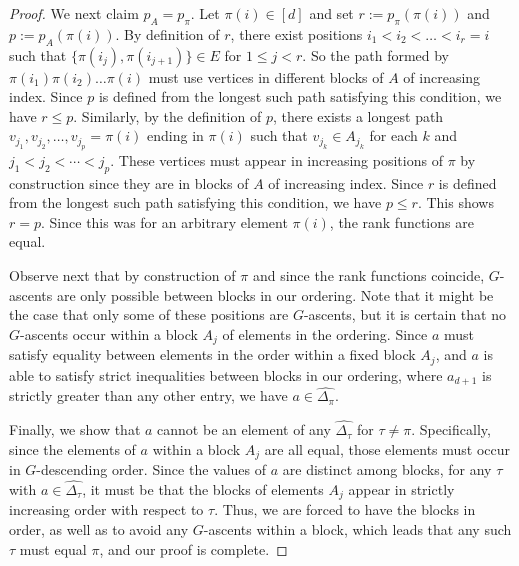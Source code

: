\documentclass[11pt]{amsart}
\newcommand{\rk}[1][\pi]{p_{#1}}
\begin{document}
\begin{proof}
We next claim $\rk[A] = \rk[\pi]$. 
Let $\pi(i) \in [d]$ and set $r := \rk(\pi(i))$ and $p :=\rk[A](\pi(i))$. 
By definition of $r$, there exist positions $i_1 < i_2 < \dots < i_r = i$ such that $\{\pi(i_j), \pi(i_{j+1}) \} \in E$ for $1 \le j < r$.
So the path formed by $\pi(i_1) \pi(i_2) \dots \pi(i)$ must use vertices in different blocks of $A$ of increasing index.
Since $p$ is defined from the longest such path satisfying this condition, we have $r \leq p$. 
Similarly, by the definition of $p$, there exists a longest path $v_{j_1}, v_{j_2}, \ldots, v_{j_p} = \pi(i)$ ending in $\pi(i)$ such that $v_{j_k} \in A_{j_k}$ for each $k$ and $j_1 < j_2 < \cdots < j_p$.
These vertices must appear in increasing positions of $\pi$ by construction since they are in blocks of $A$ of increasing index. 
Since $r$ is defined from the longest such path satisfying this condition, we have $p \leq r$.
This shows $r = p$.
Since this was for an arbitrary element $\pi(i)$, the rank functions are equal.

Observe next that by construction of $\pi$ and since the rank functions coincide, $G$-ascents are only possible between blocks in our ordering.
Note that it might be the case that only some of these positions are $G$-ascents, but it is certain that no $G$-ascents occur within a block $A_j$ of elements in the ordering.
Since $a$ must satisfy equality between elements in the order within a fixed block $A_j$, and $a$ is able to
satisfy strict inequalities between blocks in our ordering, where $a_{d+1}$ is strictly greater than any other entry, we have $a \in \widehat{\Delta_\pi}$.

Finally, we show that $a$ cannot be an element of any $\widehat{\Delta_\tau}$ for $\tau\neq \pi$.
Specifically, since the elements of $a$ within a block $A_j$ are all equal, those elements must occur in $G$-descending order. 
Since the values of $a$ are distinct among blocks, for any $\tau$ with $a\in \widehat{\Delta_\tau}$, it must be that the blocks of elements $A_j$ appear in strictly increasing order with respect to $\tau$. 
Thus, we are forced to have the blocks in order, as well as to avoid any $G$-ascents within a block, which leads that any such $\tau$ must equal $\pi$, and our proof is complete.
\end{proof}
\end{document}
